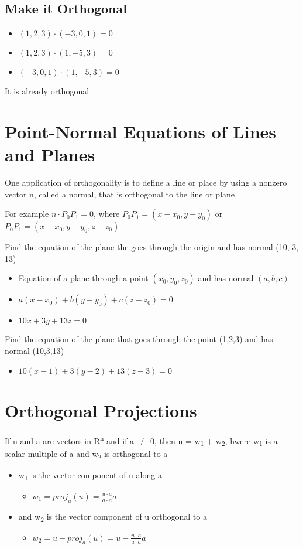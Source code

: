 \documentclass[11pt]{article}
\begin{document}
\subsection{Make it Orthogonal}
\label{sec:orga23a464}
\begin{itemize}
\item \((1,2,3) \cdot (-3,0,1) = 0\)
\item \((1,2,3) \cdot (1,-5,3) = 0\)
\item \((-3,0,1) \cdot (1,-5,3) = 0\)
\end{itemize}
It is already orthogonal
\section{Point-Normal Equations of Lines and Planes}
\label{sec:org6ea0865}
One application of orthogonality is to define a line or place by using a nonzero vector n, called a normal, that is orthogonal to the line or plane

For example \(n \cdot P_{0}P_{1} = 0\), where \(P_{0}P_{1} = (x-x_{0}, y-y_{0})\) or \(P_{0}P_{1} = (x-x_{0}, y-y_{0}, z-z_{0})\)

Find the equation of the plane the goes through the origin and has normal (10, 3, 13)
\begin{itemize}
\item Equation of a plane through a point \((x_{0}, y_{0}, z_{0})\) and has normal \((a,b,c)\)
\item \(a(x-x_{0}) + b(y-y_{0}) + c(z-z_{0}) = 0\)
\item \(10x + 3y + 13z = 0\)
\end{itemize}

Find the equation of the plane that goes through the point (1,2,3) and has normal (10,3,13)
\begin{itemize}
\item \(10(x-1) + 3(y-2) + 13(z-3) = 0\)
\end{itemize}
\section{Orthogonal Projections}
\label{sec:org1fce40f}
If u and a are vectors in R\textsuperscript{n} and if a \(\neq\) 0, then u = w\textsubscript{1} + w\textsubscript{2}, hwere w\textsubscript{1} is a scalar multiple of a and w\textsubscript{2} is orthogonal to a

\begin{itemize}
\item w\textsubscript{1} is the vector component of u along a
\begin{itemize}
\item \(w_{1} = proj_{u}(u) = \frac{u\cdot{}a}{a\cdot{}a}a\)
\end{itemize}
\item and w\textsubscript{2} is the vector component of u orthogonal to a
\begin{itemize}
\item \(w_{2} = u - proj_{a}(u) = u - \frac{u\cdot{}a}{a\cdot{}a}a\)
\end{itemize}
\end{itemize}
\end{document}
